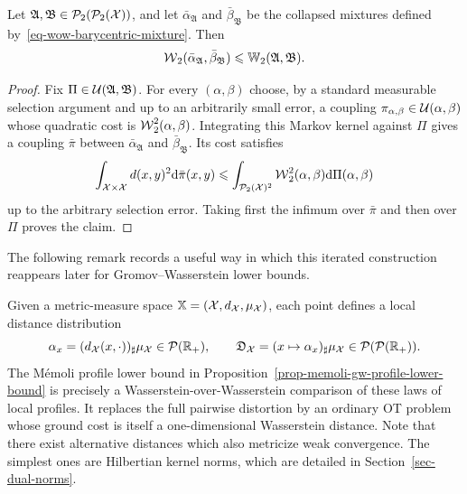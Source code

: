\begin{prop}\label{prop-wow-collapsed-bound}
	Let $\mathfrak A,\mathfrak B\in\mathcal{P}_2(\mathcal{P}_2(\mathcal{X}))$, and let $\bar\alpha_{\mathfrak A}$ and $\bar\beta_{\mathfrak B}$ be the collapsed mixtures defined by~\eqref{eq-wow-barycentric-mixture}. Then
	\[
		\operatorname{\mathcal{W}}_2(\bar\alpha_{\mathfrak A},\bar\beta_{\mathfrak B})
		\leqslant
		\mathbb W_2(\mathfrak A,\mathfrak B).
	\]
\end{prop}
\begin{proof}
	Fix $\Pi\in\mathcal{U}(\mathfrak A,\mathfrak B)$. For every $(\alpha,\beta)$ choose, by a standard measurable selection argument and up to an arbitrarily small error, a coupling $\pi_{\alpha,\beta}\in\mathcal{U}(\alpha,\beta)$ whose quadratic cost is $\operatorname{\mathcal{W}}_2^2(\alpha,\beta)$. Integrating this Markov kernel against $\Pi$ gives a coupling $\bar\pi$ between $\bar\alpha_{\mathfrak A}$ and $\bar\beta_{\mathfrak B}$. Its cost satisfies
	\[
		\int_{\mathcal{X}\times\mathcal{X}}d(x,y)^2\mathrm{d}\bar\pi(x,y)
		\leqslant
		\int_{\mathcal{P}_2(\mathcal{X})^2}\operatorname{\mathcal{W}}_2^2(\alpha,\beta)\mathrm{d}\Pi(\alpha,\beta)
	\]
	up to the arbitrary selection error. Taking first the infimum over $\bar\pi$ and then over $\Pi$ proves the claim.
\end{proof}

The following remark records a useful way in which this iterated construction reappears later for Gromov--Wasserstein lower bounds.

\begin{rem}
	Given a metric-measure space $\mathbb{X}=(\mathcal{X},d_{\mathcal{X}},\mu_{\mathcal{X}})$, each point defines a local distance distribution
\[
	\alpha_x=(d_{\mathcal{X}}(x,\cdot))_\sharp\mu_{\mathcal{X}}\in\mathcal{P}(\mathbb{R}_+),
	\qquad
	\mathfrak D_{\mathcal{X}}=(x\mapsto\alpha_x)_\sharp\mu_{\mathcal{X}}\in\mathcal{P}(\mathcal{P}(\mathbb{R}_+)).
\]
The M\'emoli profile lower bound in Proposition~\ref{prop-memoli-gw-profile-lower-bound} is precisely a Wasserstein-over-Wasserstein comparison of these laws of local profiles. It replaces the full pairwise distortion by an ordinary OT problem whose ground cost is itself a one-dimensional Wasserstein distance.
%
	Note that there exist alternative distances which also metricize weak convergence. The simplest ones are Hilbertian kernel norms, which are detailed in Section~\ref{sec-dual-norms}.
\end{rem}



